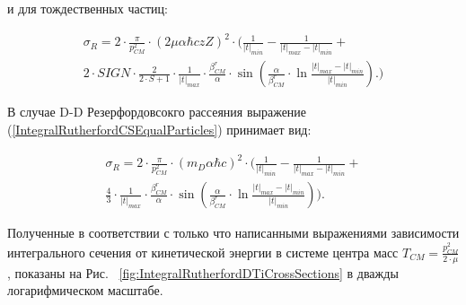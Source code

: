 \documentclass[a4paper,12pt]{article}
\begin{document}
\begin{large}
	и для тождественных частиц:
	
\begin{equation}
\label{IntegralRutherfordCSEqualParticles}
\begin{aligned} 
  \sigma_R = 2 \cdot \frac{\pi}{p^2_{CM}} \cdot \left( 2 \mu \alpha \hbar c z Z \right)^2 \cdot               \Biggl( \frac{1}{|t|_{min}} - \frac{1}{|t|_{max} - |t|_{min}} + \\
  2 \cdot SIGN \cdot \frac{2}{2 \cdot S+1} \cdot
  \frac{1}{|t|_{max}} \cdot \frac{\beta^r_{CM}}{\alpha}
  \cdot \sin{ \left( \frac{\alpha}{\beta^r_{CM}}
  \cdot \ln{ \frac{|t|_{max} - |t|_{min}}{|t|_{min}} } \right)}.
\Biggr)
\end{aligned}
\end{equation}

	В случае D-D Резерфордовсокго рассеяния выражение (\ref{IntegralRutherfordCSEqualParticles}) принимает вид:
	
\begin{equation}
\label{IntegralRutherfordCSEqualDD}
\begin{aligned} 
  \sigma_R = 2 \cdot \frac{\pi}{p^2_{CM}} \cdot \left( m_D \alpha \hbar c\right)^2 \cdot               \Biggl( \frac{1}{|t|_{min}} - \frac{1}{|t|_{max} - |t|_{min}} + \\
  \frac{4}{3} \cdot
  \frac{1}{|t|_{max}} \cdot \frac{\beta^r_{CM}}{\alpha}
  \cdot \sin{ \left( \frac{\alpha}{\beta^r_{CM}}
  \cdot \ln{ \frac{|t|_{max} - |t|_{min}}{|t|_{min}} } \right)}
\Biggr).
\end{aligned}
\end{equation}

	Полученные в соответствии с только что написанными выражениями зависимости интегрального сечения от кинетической энергии в системе центра масс $T_{CM}=\frac{p^2_{CM}}{2\cdot \mu}$, показаны на Рис. ~\ref{fig:IntegralRutherfordDTiCrossSections} в дважды логарифмическом масштабе.


\end{large}
\end{document}
